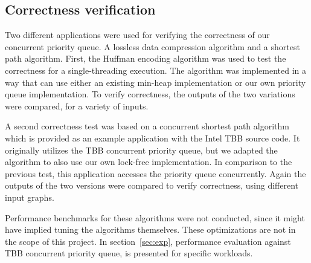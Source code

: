 \subsection{Correctness verification}
\label{subsec:corr_ver}
Two different applications were used for verifying the correctness of our concurrent priority queue.
A lossless data compression algorithm and a shortest path algorithm. 
First, the Huffman encoding algorithm was used to test the correctness for a single-threading execution. The algorithm was implemented in a way that can use either an existing min-heap implementation or our own priority queue implementation.
To verify correctness, the outputs of the two variations were compared, for a variety of inputs.

A second correctness test was based on a concurrent shortest path algorithm which is provided as an example application with the Intel TBB source code.
It originally utilizes the TBB concurrent priority queue, but we adapted the algorithm to also use our own lock-free implementation.
In comparison to the previous test, this application accesses the priority queue concurrently.
Again the outputs of the two versions were compared to verify correctness, using different input graphs.

Performance benchmarks for these algorithms were not conducted, since it might have implied tuning the algorithms themselves.
These optimizations are not in the scope of this project.
In section~\ref{sec:exp}, performance evaluation against TBB concurrent priority queue, is presented for specific workloads.

